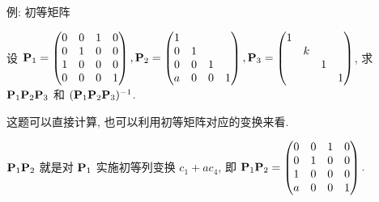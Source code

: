 \begin{frame}{例: 初等矩阵}
	\onslide<+->
	\begin{example}
		设 ${\mathbf{P}}_1=\begin{pmatrix}
			0&0&1&0\\
			0&1&0&0\\
			1&0&0&0\\
			0&0&0&1
		\end{pmatrix},{\mathbf{P}}_2=\begin{pmatrix}
			1&&&\\
			0&1&&\\
			0&0&1&\\
			a&0&0&1
		\end{pmatrix},{\mathbf{P}}_3=\begin{pmatrix}
			1&&&\\
			&k&&\\
			&&1&\\
			&&&1
		\end{pmatrix}$, 求 ${\mathbf{P}}_1{\mathbf{P}}_2{\mathbf{P}}_3$ 和 $({\mathbf{P}}_1{\mathbf{P}}_2{\mathbf{P}}_3)^{-1}$.
	\end{example}
	\onslide<+->
	这题可以直接计算, 也可以利用初等矩阵对应的变换来看.
	\begin{solution}
		${\mathbf{P}}_1{\mathbf{P}}_2$ 就是对 ${\mathbf{P}}_1$ 实施初等列变换 $c_1+ac_4$, 即 ${\mathbf{P}}_1{\mathbf{P}}_2=\begin{pmatrix}
			0&0&1&0\\
			0&1&0&0\\
			1&0&0&0\\
			a&0&0&1
		\end{pmatrix}.$
	\end{solution}
\end{frame}



